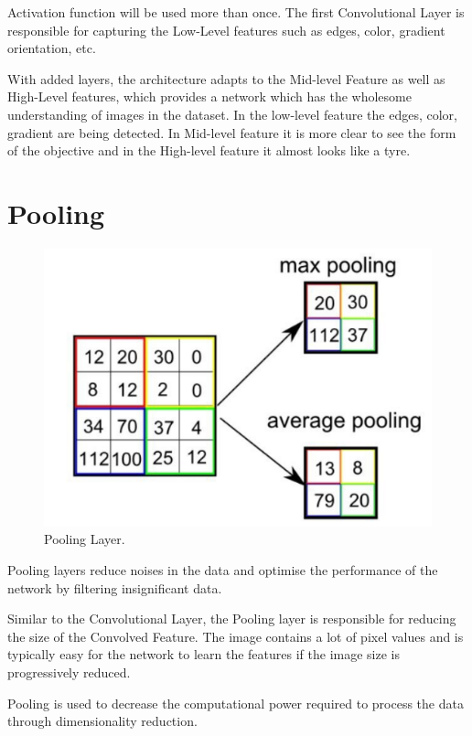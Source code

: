 \documentclass[a4paper,13pt,twoside]{book}
\begin{document}
Activation function will be used more than once.
The first Convolutional Layer is responsible for capturing the Low-Level features such as edges, color, gradient orientation, etc.

With added layers, the architecture adapts to the Mid-level Feature as well as High-Level features, which provides a network which has the wholesome understanding of images in the dataset.
In the low-level feature the edges, color, gradient are being detected. In Mid-level feature it is more clear to see the form of the objective and in the High-level feature it almost looks like a tyre.

\section{Pooling}

\begin{figure}[H]
  \includegraphics[width=\linewidth]{Images/pooling(18).png}
  \caption{Pooling Layer.}
  \label{fig:Pooling}
\end{figure}

Pooling layers reduce noises in the data and optimise the performance of the network by filtering insignificant data.

Similar to the Convolutional Layer, the Pooling layer is responsible for reducing the size of the Convolved Feature.
The image contains a lot of pixel values and is typically easy for the network to learn the features if the image size is progressively reduced.

Pooling is used to decrease the computational power required to process the data through dimensionality reduction.
\end{document}
